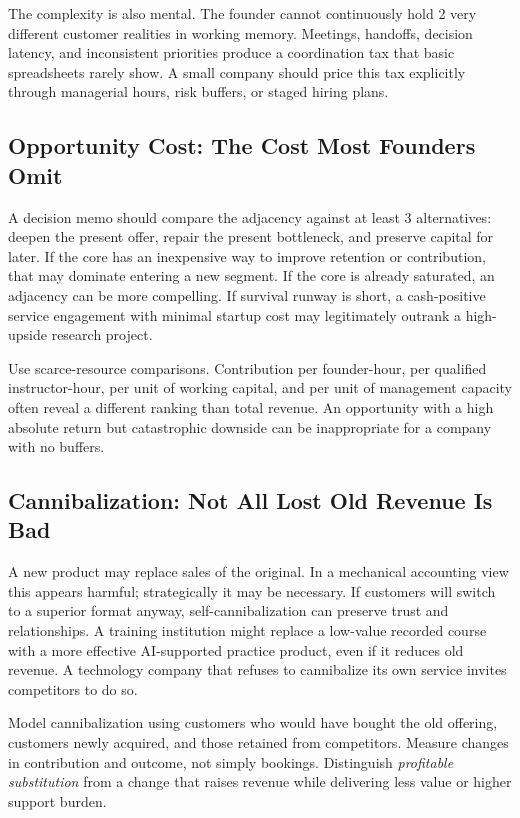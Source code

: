 The complexity is also mental. The founder cannot continuously hold 2 very different customer realities in working memory. Meetings, handoffs, decision latency, and inconsistent priorities produce a coordination tax that basic spreadsheets rarely show. A small company should price this tax explicitly through managerial hours, risk buffers, or staged hiring plans.

\subsection{Opportunity Cost: The Cost Most Founders Omit}
\label{sec:opportunity_cost_omitted}

A decision memo should compare the adjacency against at least 3 alternatives: deepen the present offer, repair the present bottleneck, and preserve capital for later. If the core has an inexpensive way to improve retention or contribution, that may dominate entering a new segment. If the core is already saturated, an adjacency can be more compelling. If survival runway is short, a cash-positive service engagement with minimal startup cost may legitimately outrank a high-upside research project.

Use scarce-resource comparisons. Contribution per founder-hour, per qualified instructor-hour, per unit of working capital, and per unit of management capacity often reveal a different ranking than total revenue. An opportunity with a high absolute return but catastrophic downside can be inappropriate for a company with no buffers.

\subsection{Cannibalization: Not All Lost Old Revenue Is Bad}
\label{sec:cannibalization_not_all_bad}

A new product may replace sales of the original. In a mechanical accounting view this appears harmful; strategically it may be necessary. If customers will switch to a superior format anyway, self-cannibalization can preserve trust and relationships. A training institution might replace a low-value recorded course with a more effective AI-supported practice product, even if it reduces old revenue. A technology company that refuses to cannibalize its own service invites competitors to do so.

Model cannibalization using customers who would have bought the old offering, customers newly acquired, and those retained from competitors. Measure changes in contribution and outcome, not simply bookings. Distinguish \textit{profitable substitution} from a change that raises revenue while delivering less value or higher support burden.

